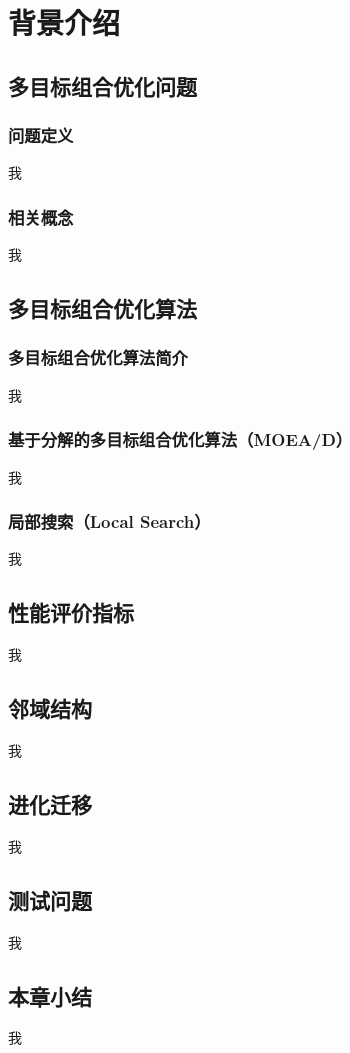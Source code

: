 \chapter{背景介绍}

\section{多目标组合优化问题}

\subsection{问题定义}

我

\subsection{相关概念}

我

\section{多目标组合优化算法}

\subsection{多目标组合优化算法简介}

我

\subsection{基于分解的多目标组合优化算法（MOEA/D）}

我

\subsection{局部搜索（Local Search）}

我

\section{性能评价指标}

我

\section{邻域结构}

我

\section{进化迁移}

我

\section{测试问题}

我

\section{本章小结}

我